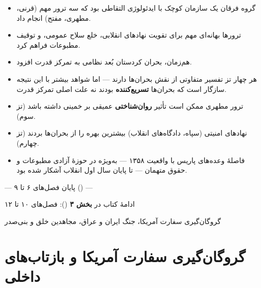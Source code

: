 \documentclass[12pt,a4paper]{book}
\newcommand{\keyword}[1]{\textbf{\textcolor{cPrimary}{#1}}}
\newcommand{\en}[1]{\lr{\textit{#1}}}
\begin{document}
\begin{principleBox}
\begin{itemize}[label=\textcolor{cPrimary}{$\blacksquare$}, rightmargin=2em]
    \item گروه فرقان یک سازمان کوچک با ایدئولوژی التقاطی بود که سه ترور مهم (قرنی، مطهری، مفتح) انجام داد.
    \item ترورها بهانه‌ای مهم برای تقویت نهادهای انقلابی، خلع سلاح عمومی، و توقیف مطبوعات فراهم کرد.
    \item هم‌زمان، بحران کردستان بُعد نظامی به تمرکز قدرت افزود.
    \item هر چهار تز تفسیر متفاوتی از نقش بحران‌ها دارند — اما شواهد بیشتر با این نتیجه سازگار است که بحران‌ها \keyword{تسریع‌کننده} بودند نه علت اصلی تمرکز قدرت.
    \item ترور مطهری ممکن است تأثیر \keyword{روان‌شناختی} عمیقی بر خمینی داشته باشد (تز سوم).
    \item نهادهای امنیتی (سپاه، دادگاه‌های انقلاب) بیشترین بهره را از بحران‌ها بردند (تز چهارم).
    \item فاصلهٔ وعده‌های پاریس با واقعیت ۱۳۵۸ — به‌ویژه در حوزهٔ آزادی مطبوعات و حقوق متهمان — تا پایان سال اول انقلاب آشکار شده بود.
\end{itemize}
\end{principleBox}

\vspace{1cm}

\begin{center}

\vspace{0.5cm}
{\small\color{cGray} — پایان فصل‌های ۶ تا ۹ (\en{Segment 2}) —}

\vspace{0.3cm}
{\small\color{cGray} ادامهٔ کتاب در \textbf{بخش ۳} (\en{Segment 3}): فصل‌های ۱۰ تا ۱۲}

\vspace{0.2cm}
{\small\color{cGray} گروگان‌گیری سفارت آمریکا، جنگ ایران و عراق، مجاهدین خلق و بنی‌صدر}
\end{center}

\chapter{گروگان‌گیری سفارت آمریکا و بازتاب‌های داخلی}
\end{document}
